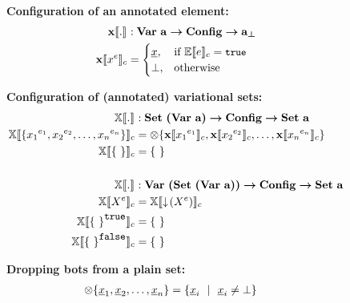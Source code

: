 \begin{figure}
%
\textbf{Configuration of an annotated element:}
\begin{alignat*}{1}
\xeSem [] . &: \elemSet \totype \confSet \totype \maybe \pelemSet\\
\xeSem {\annot \elem} &=
  \begin{cases}
    \pElem, & \If \fSem {\dimMeta} = \t\\
    \bot, &\Otherwise    
  \end{cases}
\end{alignat*}

\medskip
\textbf{Configuration of (annotated) variational sets:}
\begin{alignat*}{1}
\osetSem [] . &: \vsetSet \totype \confSet \totype \psetSet\\
\osetSem {\setDef{\annot [\dimMeta_1] {\elem_1}, \annot [\dimMeta_2] {\elem_2}, \ldots, \annot [\dimMeta_n] {\elem_n}}} &= \dropbot {\setDef{\xeSem {\annot [\dimMeta_1] {\elem_1}}, 
\xeSem {\annot [\dimMeta_2] {\elem_2}}, \ldots, \xeSem {\annot [\dimMeta_n] {\elem_n}} }}\\
\osetSem {\setDef \ } &= \setDef \ \\
%
&\\
%
\osetSem [] . &: \annotvsetSet \totype \confSet \totype \psetSet\\
\osetSem {\annot {\vset}} &= \osetSem {\pushIn {\annot \vset}}\\
\osetSem {\annot [\t] {\setDef \ }} & = \setDef \ \\
\osetSem {\annot [\f] {\setDef \ }} & = \setDef \ 
\end{alignat*}

\medskip
\textbf{Dropping bots from a plain set:}
\begin{alignat*}{1}
\dropbot {\setDef {\pElem_1, \pElem_2, \ldots, \pElem_n}} &= \setDef {\pElem_i \myOR \pElem_i \neq \bot}
\end{alignat*}


\end{figure}
